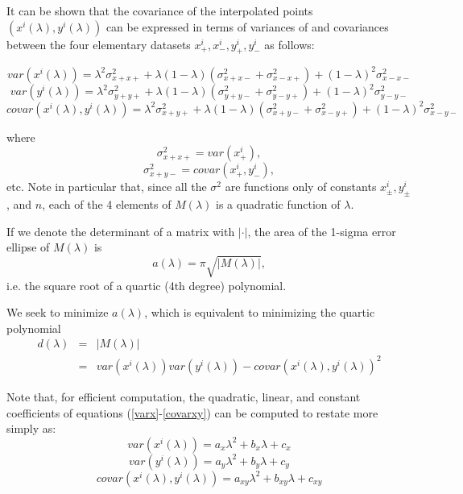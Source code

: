 \documentclass[10pt]{amsart}
\begin{document}
It can be shown that the covariance of the interpolated points
$(x^i(\lambda), y^i(\lambda))$ can be expressed in terms of variances of and
covariances between the four elementary datasets $x^i_+, x^i_-, y^i_+, y^i_-$ as
follows:

\begin{equation}\label{varx}
var(x^i(\lambda)) = \lambda^2\sigma^2_{x+x+} + \lambda(1-\lambda)(\sigma^2_{x+x-} + \sigma^2_{x-x+}) 
                + (1-\lambda)^2\sigma^2_{x-x-}
\end{equation}
\begin{equation}\label{vary}
var(y^i(\lambda)) = \lambda^2\sigma^2_{y+y+} + \lambda(1-\lambda)(\sigma^2_{y+y-} + \sigma^2_{y-y+}) 
                + (1-\lambda)^2\sigma^2_{y-y-}\end{equation}
\begin{equation}\label{covarxy}
covar(x^i(\lambda),y^i(\lambda)) = \lambda^2\sigma^2_{x+y+}  
                        + \lambda(1-\lambda)(\sigma^2_{x+y-} + \sigma^2_{x-y+}) 
                              + (1-\lambda)^2\sigma^2_{x-y-}
\end{equation}

where
$$\sigma^2_{x+x+}=var(x^i_+),$$
$$\sigma^2_{x+y-}=covar(x^i_+, y^i_-),$$ 
etc. Note in particular that, since all the $\sigma^2$ are functions only of
constants $x^i_\pm, y^i_\pm$, and $n$, each of the 4 elements of $M(\lambda)$ is
a quadratic function of $\lambda$.

If we denote the determinant of a matrix with $|\cdot|$, the area of the
1-sigma error ellipse of $M(\lambda)$ is
$$a(\lambda) = \pi\sqrt{|M(\lambda)|},$$
i.e. the square root of a quartic (4th degree) polynomial.

We seek to minimize $a(\lambda)$, which is equivalent to minimizing
the quartic polynomial 
\begin{eqnarray*}
d(\lambda)&=&|M(\lambda)| \\
          &=&var(x^i(\lambda))var(y^i(\lambda)) - covar(x^i(\lambda),y^i(\lambda))^2
\end{eqnarray*}

Note that, for efficient computation, the quadratic, linear, and
constant coefficients of equations (\ref{varx}-\ref{covarxy}) can be
computed to restate more simply as:
\begin{equation}\label{qx}
var(x^i(\lambda)) = a_x\lambda^2 + b_x\lambda + c_x
\end{equation}
\begin{equation}\label{qy}
var(y^i(\lambda)) = a_y\lambda^2 + b_y\lambda + c_y
\end{equation}
\begin{equation}\label{qxy}
covar(x^i(\lambda),y^i(\lambda)) = a_{xy}\lambda^2 + b_{xy}\lambda + c_{xy}
\end{equation}
\end{document}
